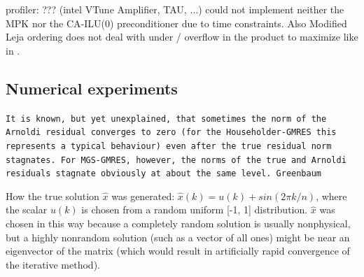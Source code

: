 \documentclass{scrartcl}
\begin{document}
 profiler: ??? (intel VTune Amplifier, TAU, $\ldots$) could not implement neither the MPK nor the CA-ILU(0) preconditioner due to time constraints. Also Modified Leja ordering does not deal with under / overflow in the product to maximize like in \cite{Hoemmen:2010:CKS:1970638}.
\subsection{Numerical experiments}
\texttt{It is known, but yet unexplained, that sometimes the norm of the Arnoldi residual converges to zero (for the Householder-GMRES this represents a typical behaviour) even after the true residual norm stagnates. For MGS-GMRES, however, the norms of the true and Arnoldi residuals stagnate obviously at about the same level. Greenbaum~\cite{Greenbaum97numericalbehaviour}}

How the true solution $\hat{x}$ was generated: $\hat{x}(k) = u(k) + sin(2\pi k/n)$,
where the scalar $u(k)$ is chosen from a random uniform [-1, 1] distribution. 
$\hat{x}$ was chosen in this way because a completely random solution is usually nonphysical, but a highly nonrandom solution (such as a vector of all ones) might be near an eigenvector of the matrix (which would result in artificially rapid convergence of the iterative method).
\end{document}

